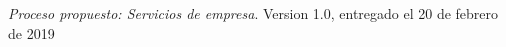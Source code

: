 \begin{thebibliography}{widestlabel}

	 \textit{Proceso propuesto: Servicios de empresa}. Version 1.0, entregado el 20 de febrero de 2019

\end{thebibliography}
	